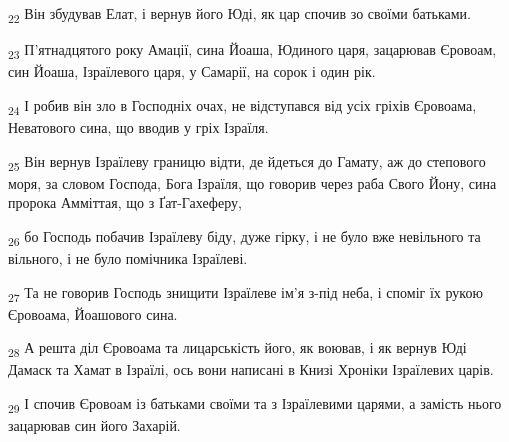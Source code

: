 \begin{tcolorbox}
\textsubscript{22} Він збудував Елат, і вернув його Юді, як цар спочив зо своїми батьками.
\end{tcolorbox}
\begin{tcolorbox}
\textsubscript{23} П'ятнадцятого року Амації, сина Йоаша, Юдиного царя, зацарював Єровоам, син Йоаша, Ізраїлевого царя, у Самарії, на сорок і один рік.
\end{tcolorbox}
\begin{tcolorbox}
\textsubscript{24} І робив він зло в Господніх очах, не відступався від усіх гріхів Єровоама, Неватового сина, що вводив у гріх Ізраїля.
\end{tcolorbox}
\begin{tcolorbox}
\textsubscript{25} Він вернув Ізраїлеву границю відти, де йдеться до Гамату, аж до степового моря, за словом Господа, Бога Ізраїля, що говорив через раба Свого Йону, сина пророка Амміттая, що з Ґат-Гахеферу,
\end{tcolorbox}
\begin{tcolorbox}
\textsubscript{26} бо Господь побачив Ізраїлеву біду, дуже гірку, і не було вже невільного та вільного, і не було помічника Ізраїлеві.
\end{tcolorbox}
\begin{tcolorbox}
\textsubscript{27} Та не говорив Господь знищити Ізраїлеве ім'я з-під неба, і споміг їх рукою Єровоама, Йоашового сина.
\end{tcolorbox}
\begin{tcolorbox}
\textsubscript{28} А решта діл Єровоама та лицарськість його, як воював, і як вернув Юді Дамаск та Хамат в Ізраїлі, ось вони написані в Книзі Хроніки Ізраїлевих царів.
\end{tcolorbox}
\begin{tcolorbox}
\textsubscript{29} І спочив Єровоам із батьками своїми та з Ізраїлевими царями, а замість нього зацарював син його Захарій.
\end{tcolorbox}
